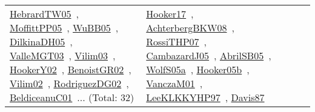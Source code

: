 {\begin{longtable}{lp{3cm}>{\raggedright\arraybackslash}p{6cm}>{\raggedright\arraybackslash}p{6cm}>{\raggedright\arraybackslash}p{8cm}}
\href{../works/HebrardTW05.pdf}{HebrardTW05}~\cite{HebrardTW05}, \href{../works/MoffittPP05.pdf}{MoffittPP05}~\cite{MoffittPP05}, \href{../works/WuBB05.pdf}{WuBB05}~\cite{WuBB05}, \href{../works/DilkinaDH05.pdf}{DilkinaDH05}~\cite{DilkinaDH05}, \href{../works/ValleMGT03.pdf}{ValleMGT03}~\cite{ValleMGT03}, \href{../works/Vilim03.pdf}{Vilim03}~\cite{Vilim03}, \href{../works/HookerY02.pdf}{HookerY02}~\cite{HookerY02}, \href{../works/BenoistGR02.pdf}{BenoistGR02}~\cite{BenoistGR02}, \href{../works/Vilim02.pdf}{Vilim02}~\cite{Vilim02}, \href{../works/RodriguezDG02.pdf}{RodriguezDG02}~\cite{RodriguezDG02}, \href{../works/BeldiceanuC01.pdf}{BeldiceanuC01}~\cite{BeldiceanuC01}... (Total: 32) & \href{../works/Hooker17.pdf}{Hooker17}~\cite{Hooker17}, \href{../works/AchterbergBKW08.pdf}{AchterbergBKW08}~\cite{AchterbergBKW08}, \href{../works/RossiTHP07.pdf}{RossiTHP07}~\cite{RossiTHP07}, \href{../works/CambazardJ05.pdf}{CambazardJ05}~\cite{CambazardJ05}, \href{../works/AbrilSB05.pdf}{AbrilSB05}~\cite{AbrilSB05}, \href{../works/WolfS05a.pdf}{WolfS05a}~\cite{WolfS05a}, \href{../works/Hooker05b.pdf}{Hooker05b}~\cite{Hooker05b}, \href{../works/VanczaM01.pdf}{VanczaM01}~\cite{VanczaM01}, \href{../works/LeeKLKKYHP97.pdf}{LeeKLKKYHP97}~\cite{LeeKLKKYHP97}, \href{../works/Davis87.pdf}{Davis87}~\cite{Davis87}\\

\end{longtable}}
